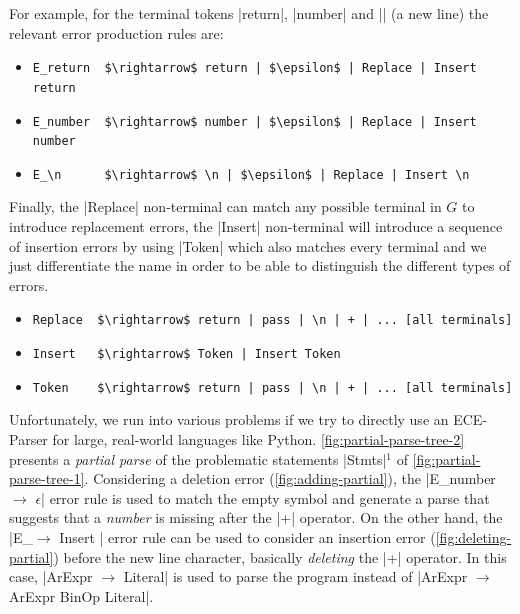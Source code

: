 For example, for the terminal tokens |return|, |number| and |\n| (a new line)
the relevant error production rules are:
\begin{itemize}
  \item \lstinline{E_return  $\rightarrow$ return | $\epsilon$ | Replace | Insert return}
  \item \lstinline{E_number  $\rightarrow$ number | $\epsilon$ | Replace | Insert number}
  \item \lstinline{E_\n      $\rightarrow$ \n | $\epsilon$ | Replace | Insert \n}
\end{itemize}
Finally, the |Replace| non-terminal can match any possible terminal in $G$ to
introduce replacement errors, the |Insert| non-terminal will introduce a
sequence of insertion errors by using |Token| which also matches every terminal
and we just differentiate the name in order to be able to distinguish the
different types of errors.
\begin{itemize}
  \item \lstinline{Replace  $\rightarrow$ return | pass | \n | + | ... [all terminals]}
  \item \lstinline{Insert   $\rightarrow$ Token | Insert Token}
  \item \lstinline{Token    $\rightarrow$ return | pass | \n | + | ... [all terminals]}
\end{itemize}







%
Unfortunately, we run into various problems if we
try to directly use an ECE-Parser for large, real-world
languages like Python.
%
\autoref{fig:partial-parse-tree-2} presents a \emph{partial
parse} of the problematic statements |Stmts|$^1$ of
\autoref{fig:partial-parse-tree-1}.
%
Considering a deletion error (\autoref{fig:adding-partial}), the
%
|E_number $\rightarrow$ $\epsilon$| error rule is used to match the empty symbol
and generate a parse that suggests that a \emph{number} is missing after the |+|
operator. On the other hand, the
%
|E_\n $\rightarrow$ Insert \n| error rule can be used to consider an insertion
error (\autoref{fig:deleting-partial}) before the new line character, basically
\emph{deleting} the |+| operator. In this case, |ArExpr $\rightarrow$ Literal|
is used to parse the program instead of
%
|ArExpr $\rightarrow$ ArExpr BinOp Literal|.

